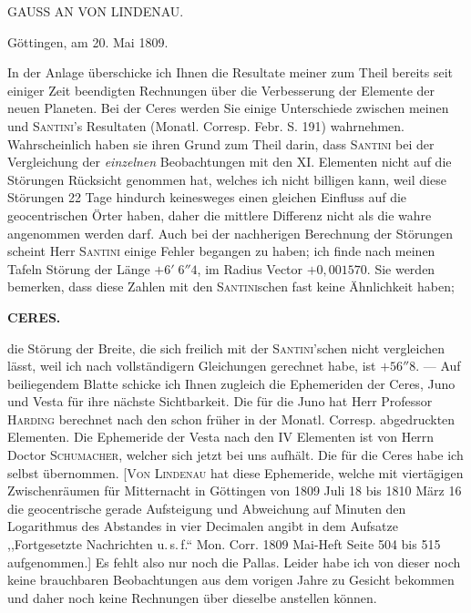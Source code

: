 \par{}\bigskip
\hypertarget{native-316-lower}{}
\begin{center}
\large GAUSS AN VON LINDENAU.
\end{center}

\begin{flushright}Göttingen, am 20. Mai 1809.\end{flushright}

\par\indent In der Anlage überschicke ich Ihnen die Resultate meiner zum Theil bereits seit einiger Zeit beendigten Rechnungen über die Verbesserung der Elemente der neuen Planeten. Bei der Ceres werden Sie einige Unterschiede zwischen meinen und \textsc{Santini}'s Resultaten (Monatl. Corresp. Febr. S. 191) wahrnehmen. Wahrscheinlich haben sie ihren Grund zum Theil darin, dass \textsc{Santini} bei der Vergleichung der \emph{einzelnen} Beobachtungen mit den XI. Elementen nicht auf die Störungen Rücksicht genommen hat, welches ich nicht billigen kann, weil diese Störungen 22 Tage hindurch keinesweges einen gleichen Einfluss auf die geocentrischen Örter haben, daher die mittlere Differenz nicht als die wahre angenommen werden darf. Auch bei der nachherigen Berechnung der Störungen scheint Herr \textsc{Santini} einige Fehler begangen zu haben; ich finde nach meinen Tafeln Störung der Länge $+6'\;6''4$, im Radius Vector $+0{,}001570$. Sie werden bemerken, dass diese Zahlen mit den \textsc{Santini}schen fast keine Ähnlichkeit haben;
\par
\clearpage
\thispagestyle{empty}
\noindent{}%
%
\parbox[t]{\dimexpr\linewidth-24mm\relax}{\centering\footnotesize\bfseries CERES.\par}%
\makebox[12mm][r]{}\par\nobreak\medskip
\noindent die Störung der Breite, die sich freilich mit der \textsc{Santini}'schen nicht vergleichen lässt, weil ich nach vollständigern Gleichungen gerechnet habe, ist $+56''8$. — Auf beiliegendem Blatte schicke ich Ihnen zugleich die Ephemeriden der Ceres, Juno und Vesta für ihre nächste Sichtbarkeit. Die für die Juno hat Herr Professor \textsc{Harding} berechnet nach den schon früher in der Monatl. Corresp. abgedruckten Elementen. Die Ephemeride der Vesta nach den IV Elementen ist von Herrn Doctor \textsc{Schumacher}, welcher sich jetzt bei uns aufhält. Die für die Ceres habe ich selbst übernommen. [\textsc{Von Lindenau} hat diese Ephemeride, welche mit viertägigen Zwischenräumen für Mitternacht in Göttingen von 1809 Juli 18 bis 1810 März 16 die geocentrische gerade Aufsteigung und Abweichung auf Minuten den Logarithmus des Abstandes in vier Decimalen angibt in dem Aufsatze ,,Fortgesetzte Nachrichten u.\,s.\,f.“ Mon. Corr. 1809 Mai-Heft Seite 504 bis 515 aufgenommen.] Es fehlt also nur noch die Pallas. Leider habe ich von dieser noch keine brauchbaren Beobachtungen aus dem vorigen Jahre zu Gesicht bekommen und daher noch keine Rechnungen über dieselbe anstellen können.

